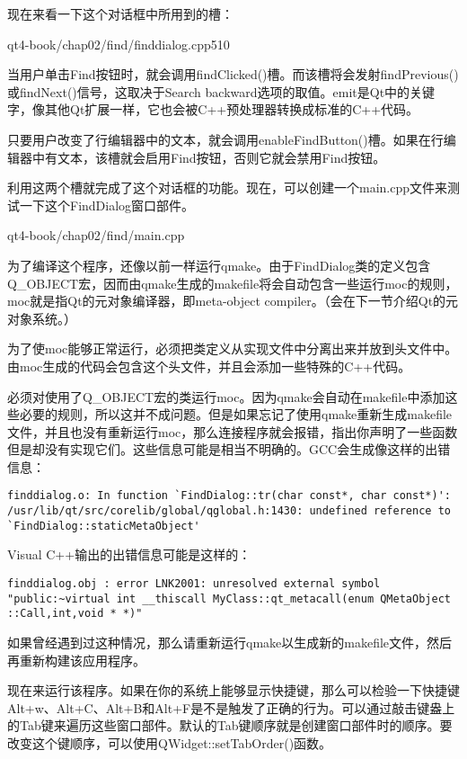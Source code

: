 \documentclass[11pt,oneside]{book}
\begin{document}
\begin{common-format}
现在来看一下这个对话框中所用到的槽：

\begin{cppline}{qt4-book/chap02/find/finddialog.cpp}{51}{0}
\end{cppline}

当用户单击Find按钮时，就会调用findClicked()槽。而该槽将会发射findPrevious()或findNext()信号，这取决于Search backward选项的取值。emit是Qt中的关键字，像其他Qt扩展一样，它也会被C++预处理器转换成标准的C++代码。

只要用户改变了行编辑器中的文本，就会调用enableFindButton()槽。如果在行编辑器中有文本，该槽就会启用Find按钮，否则它就会禁用Find按钮。

利用这两个槽就完成了这个对话框的功能。现在，可以创建一个main.cpp文件来测试一下这个FindDialog窗口部件。

\begin{cppinput}{qt4-book/chap02/find/main.cpp}
\end{cppinput}

为了编译这个程序，还像以前一样运行qmake。由于FindDialog类的定义包含Q\_{}OBJECT宏，因而由qmake生成的makefile将会自动包含一些运行moc的规则，moc就是指Qt的元对象编译器，即meta-object compiler。（会在下一节介绍Qt的元对象系统。）

为了使moc能够正常运行，必须把类定义从实现文件中分离出来并放到头文件中。由moc生成的代码会包含这个头文件，并且会添加一些特殊的C++代码。

必须对使用了Q\_{}OBJECT宏的类运行moc。因为qmake会自动在makefile中添加这些必要的规则，所以这并不成问题。但是如果忘记了使用qmake重新生成makefile文件，并且也没有重新运行moc，那么连接程序就会报错，指出你声明了一些函数但是却没有实现它们。这些信息可能是相当不明确的。GCC会生成像这样的出错信息：
\begin{Verbatim}
finddialog.o: In function `FindDialog::tr(char const*, char const*)':
/usr/lib/qt/src/corelib/global/qglobal.h:1430: undefined reference to
`FindDialog::staticMetaObject'
\end{Verbatim}

Visual C++输出的出错信息可能是这样的：
\begin{Verbatim}
finddialog.obj : error LNK2001: unresolved external symbol
"public:~virtual int __thiscall MyClass::qt_metacall(enum QMetaObject
::Call,int,void * *)"
\end{Verbatim}

如果曾经遇到过这种情况，那么请重新运行qmake以生成新的makefile文件，然后再重新构建该应用程序。

现在来运行该程序。如果在你的系统上能够显示快捷键，那么可以检验一下快捷键Alt+w、Alt+C、Alt+B和Alt+F是不是触发了正确的行为。可以通过敲击键盎上的Tab键来遍历这些窗口部件。默认的Tab键顺序就是创建窗口部件时的顺序。要改变这个键顺序，可以使用QWidget::setTabOrder()函数。


\end{common-format}
\end{document}
